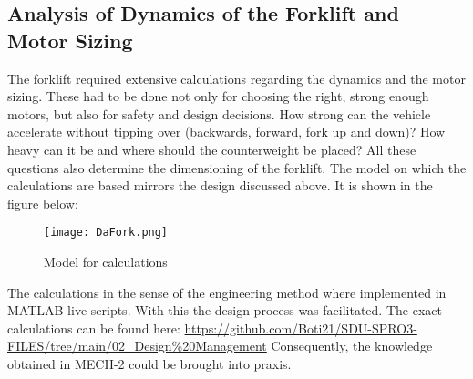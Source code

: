 \documentclass[../report.tex]{subfiles}
\begin{document}
\subsection{Analysis of Dynamics of the Forklift and Motor Sizing}
The forklift required extensive calculations regarding the dynamics and the motor sizing.
These had to be done not only for choosing the right, strong
enough motors, but also for safety and design decisions. How strong can the vehicle accelerate
without tipping over (backwards, forward, fork up and down)? How heavy can it be and where should 
the counterweight be placed? All these questions also determine the dimensioning of the forklift.
The model on which the calculations are based mirrors the design discussed above. It is shown in the 
figure below:
\begin{figure}[H]
    \centering
    \texttt{[image: DaFork.png]}
    \caption{Model for calculations}
\end{figure} 
The calculations in the sense of the engineering method where implemented 
in MATLAB live scripts. With this the design process was facilitated. The
exact calculations can be found here: \url{https://github.com/Boti21/SDU-SPRO3-FILES/tree/main/02_Design%20Management}
Consequently, the knowledge obtained in MECH-2 could be brought into praxis.
\end{document}
